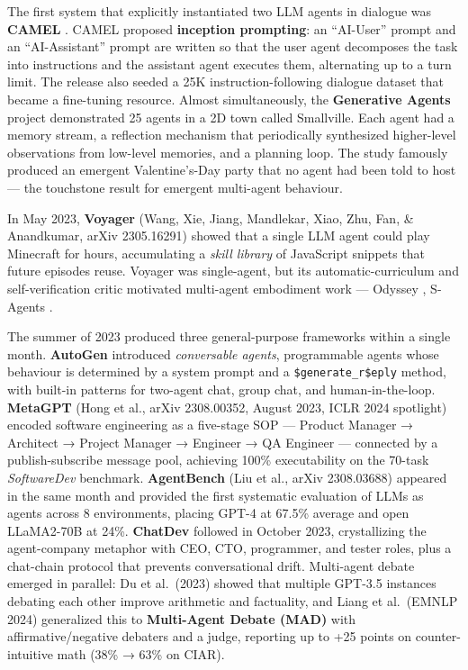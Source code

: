 \documentclass{article}
\begin{document}
The first system that explicitly instantiated two LLM agents in dialogue was \textbf{CAMEL} \citep{li2023camelcommunicative}. CAMEL proposed \textbf{inception prompting}: an ``AI-User'' prompt and an ``AI-Assistant'' prompt are written so that the user agent decomposes the task into instructions and the assistant agent executes them, alternating up to a turn limit. The release also seeded a 25K instruction-following dialogue dataset that became a fine-tuning resource. Almost simultaneously, the \textbf{Generative Agents} project \citep{park2023generativeagentsin} demonstrated 25 agents in a 2D town called Smallville. Each agent had a memory stream, a reflection mechanism that periodically synthesized higher-level observations from low-level memories, and a planning loop. The study famously produced an emergent Valentine's-Day party that no agent had been told to host --- the touchstone result for emergent multi-agent behaviour.

In May 2023, \textbf{Voyager} (Wang, Xie, Jiang, Mandlekar, Xiao, Zhu, Fan, \& Anandkumar, arXiv 2305.16291) showed that a single LLM agent could play Minecraft for hours, accumulating a \emph{skill library} of JavaScript snippets that future episodes reuse. Voyager was single-agent, but its automatic-curriculum and self-verification critic motivated multi-agent embodiment work --- Odyssey \citep{liu20242024}, S-Agents \citep{chen2024asurveyonllmbasedm}.

The summer of 2023 produced three general-purpose frameworks within a single month. \textbf{AutoGen} \citep{wu2023autogenenablingnex} introduced \emph{conversable agents}, programmable agents whose behaviour is determined by a system prompt and a \texttt{\$generate\_r\$eply} method, with built-in patterns for two-agent chat, group chat, and human-in-the-loop. \textbf{MetaGPT} (Hong et al., arXiv 2308.00352, August 2023, ICLR 2024 spotlight) encoded software engineering as a five-stage SOP --- Product Manager → Architect → Project Manager → Engineer → QA Engineer --- connected by a publish-subscribe message pool, achieving 100\% executability on the 70-task \emph{SoftwareDev} benchmark. \textbf{AgentBench} (Liu et al., arXiv 2308.03688) appeared in the same month and provided the first systematic evaluation of LLMs as agents across 8 environments, placing GPT-4 at 67.5\% average and open LLaMA2-70B at 24\%. \textbf{ChatDev} \citep{qian20242023} followed in October 2023, crystallizing the agent-company metaphor with CEO, CTO, programmer, and tester roles, plus a chat-chain protocol that prevents conversational drift. Multi-agent debate emerged in parallel: Du et al.~(2023) showed that multiple GPT-3.5 instances debating each other improve arithmetic and factuality, and Liang et al.~(EMNLP 2024) generalized this to \textbf{Multi-Agent Debate (MAD)} with affirmative/negative debaters and a judge, reporting up to +25 points on counter-intuitive math (38\% → 63\% on CIAR).
\end{document}

